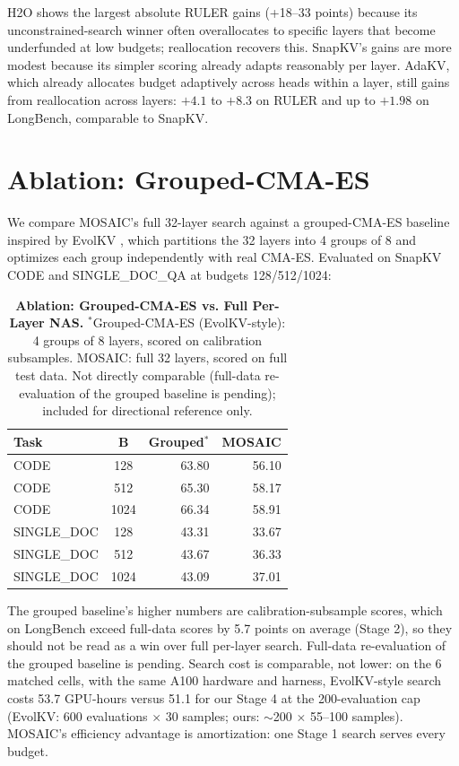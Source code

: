 \documentclass[11pt]{article}
\begin{document}
H2O shows the largest absolute RULER gains (+18–33 points) because its unconstrained-search winner often overallocates to specific layers that become underfunded at low budgets; reallocation recovers this. SnapKV's gains are more modest because its simpler scoring already adapts reasonably per layer. AdaKV, which already allocates budget adaptively across heads within a layer, still gains from reallocation across layers: $+4.1$ to $+8.3$ on RULER and up to $+1.98$ on LongBench, comparable to SnapKV.

\section{Ablation: Grouped-CMA-ES}

We compare MOSAIC's full 32-layer search against a grouped-CMA-ES baseline inspired by EvolKV \citep{yu2025evolkv}, which partitions the 32 layers into 4 groups of 8 and optimizes each group independently with real CMA-ES. Evaluated on SnapKV CODE and SINGLE\_DOC\_QA at budgets 128/512/1024:

\begin{table}[t]
  \centering
  \small
  \setlength{\tabcolsep}{8pt}
  \begin{tabular}{@{} l c r r @{}}
    \toprule
    \textbf{Task} & \textbf{B} & \textbf{Grouped}$^*$ & \textbf{MOSAIC} \\
    \midrule
    \rowcolor{gray!10}
    CODE & 128 & 63.80 & 56.10 \\
    CODE & 512 & 65.30 & 58.17 \\
    \rowcolor{gray!10}
    CODE & 1024 & 66.34 & 58.91 \\
    SINGLE\_DOC & 128 & 43.31 & 33.67 \\
    \rowcolor{gray!10}
    SINGLE\_DOC & 512 & 43.67 & 36.33 \\
    SINGLE\_DOC & 1024 & 43.09 & 37.01 \\
    \bottomrule
  \end{tabular}
  \caption{\textbf{Ablation: Grouped-CMA-ES vs. Full Per-Layer NAS.} $^*$Grouped-CMA-ES (EvolKV-style): 4 groups of 8 layers, scored on calibration subsamples. MOSAIC: full 32 layers, scored on full test data. Not directly comparable (full-data re-evaluation of the grouped baseline is pending); included for directional reference only.}
  \label{tab:ablation}
\end{table}

The grouped baseline's higher numbers are calibration-subsample scores, which on LongBench exceed full-data scores by 5.7 points on average (Stage 2), so they should not be read as a win over full per-layer search. Full-data re-evaluation of the grouped baseline is pending. Search cost is comparable, not lower: on the 6 matched cells, with the same A100 hardware and harness, EvolKV-style search costs 53.7 GPU-hours versus 51.1 for our Stage 4 at the 200-evaluation cap (EvolKV: 600 evaluations $\times$ 30 samples; ours: $\sim$200 $\times$ 55--100 samples). MOSAIC's efficiency advantage is amortization: one Stage 1 search serves every budget.
\end{document}

